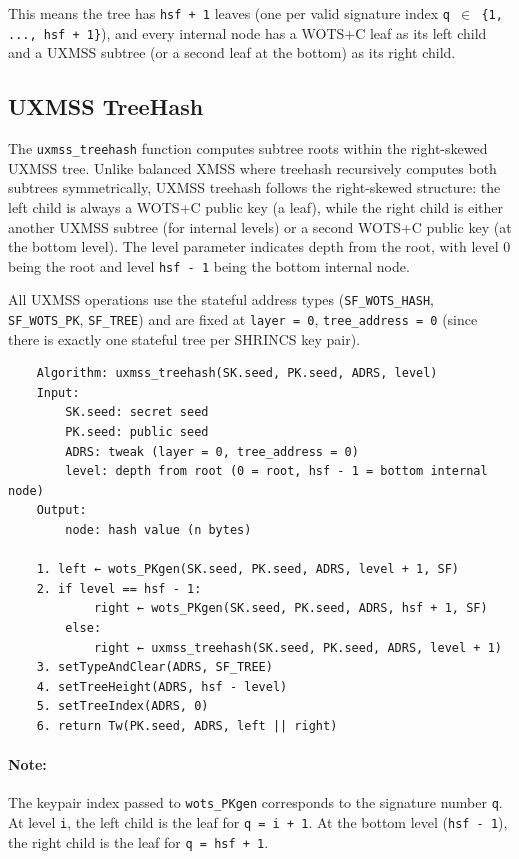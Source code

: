This means the tree has \texttt{hsf + 1} leaves (one per valid signature index \texttt{q $\in$ \{1, ..., hsf + 1\}}), and every internal node has a WOTS+C leaf as its left child and a UXMSS subtree (or a second leaf at the bottom) as its right child.

\subsection{UXMSS TreeHash}
The \texttt{uxmss\_treehash} function computes subtree roots within the right-skewed UXMSS tree. Unlike balanced XMSS where treehash recursively computes both subtrees symmetrically, UXMSS treehash follows the right-skewed structure: the left child is always a WOTS+C public key (a leaf), while the right child is either another UXMSS subtree (for internal levels) or a second WOTS+C public key (at the bottom level). The level parameter indicates depth from the root, with level 0 being the root and level \texttt{hsf - 1} being the bottom internal node.

All UXMSS operations use the stateful address types (\texttt{SF\_WOTS\_HASH}, \texttt{SF\_WOTS\_PK}, \texttt{SF\_TREE}) and are fixed at \texttt{layer = 0}, \texttt{tree\_address = 0} (since there is exactly one stateful tree per SHRINCS key pair).

\begin{verbatim}
    Algorithm: uxmss_treehash(SK.seed, PK.seed, ADRS, level)
    Input:
        SK.seed: secret seed
        PK.seed: public seed
        ADRS: tweak (layer = 0, tree_address = 0)
        level: depth from root (0 = root, hsf - 1 = bottom internal node)
    Output:
        node: hash value (n bytes)

    1. left ← wots_PKgen(SK.seed, PK.seed, ADRS, level + 1, SF)
    2. if level == hsf - 1:
            right ← wots_PKgen(SK.seed, PK.seed, ADRS, hsf + 1, SF)
        else:
            right ← uxmss_treehash(SK.seed, PK.seed, ADRS, level + 1)
    3. setTypeAndClear(ADRS, SF_TREE)
    4. setTreeHeight(ADRS, hsf - level)
    5. setTreeIndex(ADRS, 0)
    6. return Tw(PK.seed, ADRS, left || right)
\end{verbatim}
\paragraph{Note:} The keypair index passed to \texttt{wots\_PKgen} corresponds to the signature number \texttt{q}. At level \texttt{i}, the left child is the leaf for \texttt{q = i + 1}. At the bottom level (\texttt{hsf - 1}), the right child is the leaf for \texttt{q = hsf + 1}.

